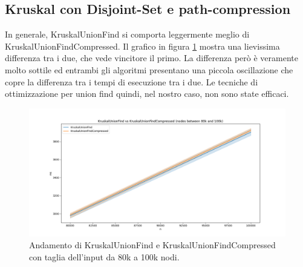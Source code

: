 \subsection{Kruskal con Disjoint-Set e path-compression}

In generale, KruskalUnionFind si comporta leggermente meglio di
KruskalUnionFindCompressed.  Il grafico in figura
\ref{fig:Kruskal-KruskalCompressed-80k-100k} mostra una lievissima
differenza tra i due, che vede vincitore il primo. La differenza però
è veramente molto sottile ed entrambi gli algoritmi presentano una
piccola oscillazione che copre la differenza tra i tempi di esecuzione
tra i due. Le tecniche di ottimizzazione per union find quindi, nel
nostro caso, non sono state efficaci.

\begin{figure}[H]
    \centering
    \includegraphics[width=1.0\textwidth]{./images/KruskalUnionFind_vs_KruskalUnionFindCompressed_(nodes_between_80k_and_100k).png}
	\caption{Andamento di KruskalUnionFind e KruskalUnionFindCompressed con taglia dell'input da 80k a 100k nodi.}
    \label{fig:Kruskal-KruskalCompressed-80k-100k}
\end{figure}

